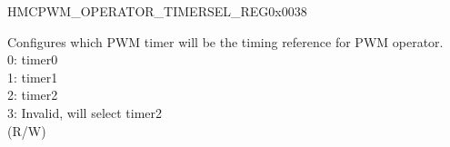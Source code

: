 \begin{register}{H}{MCPWM\_OPERATOR\_TIMERSEL\_REG}{0x0038}\label{regdesc:MCPWMOPERATORTIMERSELREG}
%
%
%
%
\regnewline%
\begin{regdesc}\begin{reglist}
\label{fielddesc:MCPWMOPERATORNTIMERSEL}\item [MCPWM\_OPERATOR\regindex{n}\_TIMERSEL] Configures which PWM timer will be the timing reference for PWM operator.\\
0: timer0 \\
1: timer1 \\
2: timer2 \\
3: Invalid, will select timer2 \\
(R/W)
\end{reglist}\end{regdesc}
\end{register}



